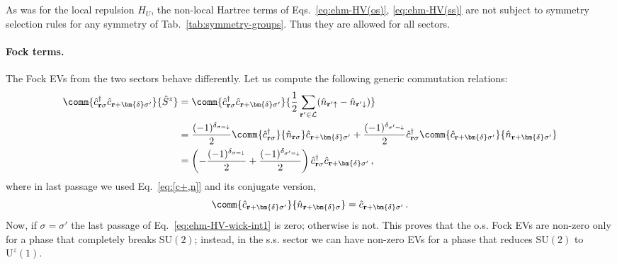 As was for the local repulsion $\hat H_U$, the non-local Hartree terms of Eqs.~\eqref{eq:ehm-HV(os)}, \eqref{eq:ehm-HV(ss)} are not subject to symmetry selection rules for any symmetry of Tab.~\ref{tab:symmetry-groups}. Thus they are allowed for all sectors.

\paragraph{Fock terms.}

The Fock EVs from the two sectors behave differently. Let us compute the following generic commutation relations:
\begin{align}
	\comm{\hat c_{\mathbf{r}\sigma}^\dagger \hat c_{\mathbf{r}+\bm{\delta}\sigma'}}{\hat S^z} &= \comm{\hat c_{\mathbf{r}\sigma}^\dagger \hat c_{\mathbf{r}+\bm{\delta}\sigma'}}{\frac{1}{2} \sum_{\mathbf{r}'\in\mathcal{L}} (\hat n_{\mathbf{r}'\uparrow}-\hat n_{\mathbf{r}'\downarrow}) } \nonumber \\
	&= \frac{(-1)^{\delta_{\sigma=\downarrow}}}{2} \comm{\hat c_{\mathbf{r}\sigma}^\dagger}{\hat n_{\mathbf{r}\sigma}} \hat c_{\mathbf{r}+\bm{\delta}\sigma'} + \frac{(-1)^{\delta_{\sigma'=\downarrow}}}{2} \hat c_{\mathbf{r}\sigma}^\dagger \comm{\hat c_{\mathbf{r}+\bm{\delta}\sigma'}}{\hat n_{\mathbf{r}+\bm{\delta}\sigma'}} \nonumber \\
	&= \left(
		-\frac{(-1)^{\delta_{\sigma=\downarrow}}}{2} + \frac{(-1)^{\delta_{\sigma'=\downarrow}}}{2}
	\right)\hat c_{\mathbf{r}\sigma}^\dagger \hat c_{\mathbf{r}+\bm{\delta}\sigma'} \, , \label{eq:ehm-HV-wick-int1}
\end{align}
where in last passage we used Eq.~\eqref{eq:[c+,n]} and its conjugate version,
\[
	\comm{\hat c_{\mathbf{r}+\bm{\delta}\sigma'}}{\hat n_{\mathbf{r}+\bm{\delta}\sigma}} = \hat c_{\mathbf{r}+\bm{\delta}\sigma'} \, .
\]
Now, if $\sigma=\sigma'$ the last passage of Eq.~\eqref{eq:ehm-HV-wick-int1} is zero; otherwise is not. This proves that the o.s. Fock EVs are non-zero only for a phase that completely breaks $\mathrm{SU}(2)$; instead, in the s.s. sector we can have non-zero EVs for a phase that reduces $\mathrm{SU}(2)$ to $\mathrm{U}^z(1)$.

